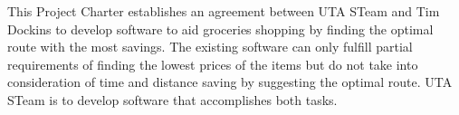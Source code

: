 This Project Charter establishes an agreement between UTA STeam and Tim Dockins to develop software to aid groceries shopping by finding the optimal route with the most savings. The existing software can only fulfill partial requirements of finding the lowest prices of the items but do not take into consideration of time and distance saving by suggesting the optimal route. UTA STeam is to develop software that accomplishes both tasks.
